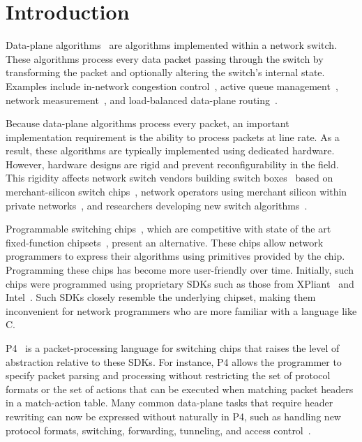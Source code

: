 \section{Introduction}
\label{s:intro}

Data-plane algorithms~\cite{cestan} are algorithms implemented within a network
switch. These algorithms process every data packet passing through the switch
by transforming the packet and optionally altering the switch's internal state.
Examples include in-network congestion control~\cite{xcp, rcp, pdq, dctcp},
active queue management~\cite{codel}, network measurement~\cite{opensketch,
bitmap_george, elephant_george}, and load-balanced data-plane
routing~\cite{conga}.

Because data-plane algorithms process every packet, an important implementation
requirement is the ability to process packets at line rate.  As a result, these
algorithms are typically implemented using dedicated hardware. However,
hardware designs are rigid and prevent reconfigurability in the field. This
rigidity affects network switch vendors building switch
boxes~\cite{cisco_nexus, dell_force10, arista_7050} based on merchant-silicon
switch chips~\cite{trident, tomahawk, mellanox}, network operators using
merchant silicon within private networks~\cite{google,facebook,vl2}, and
researchers developing new switch algorithms~\cite{xcp, codel, d3, detail,
pdq}.
%

Programmable switching chips~\cite{flexpipe, xpliant, rmt}, which are
competitive with state of the art fixed-function chipsets~\cite{trident,
tomahawk, mellanox}, present an alternative.  These chips allow network
programmers to express their algorithms using primitives provided by the chip.
Programming these chips has become more user-friendly over time.  Initially,
such chips were programmed using proprietary SDKs such as those from
XPliant~\cite{xpliant_sdk, xpliant_sdk2} and Intel~\cite{intel_sdk}. Such SDKs
closely resemble the underlying chipset, making them inconvenient for network
programmers who are more familiar with a language like C.

P4~\cite{p4, p4spec} is a packet-processing language for switching chips that
raises the level of abstraction relative to these SDKs.  For instance, P4
allows the programmer to specify packet parsing and processing without
restricting the set of protocol formats or the set of actions that can be
executed when matching packet headers in a match-action table. Many common
data-plane tasks that require header rewriting can now be expressed without
naturally in P4, such as handling new protocol formats, switching, forwarding,
tunneling, and access control~\cite{dc_p4}.


